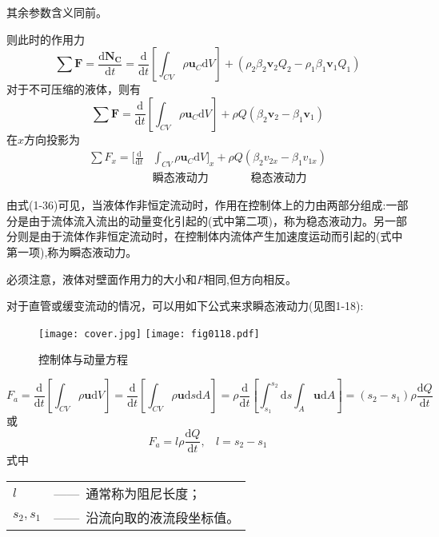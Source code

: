 其余参数含义同前。

则此时的作用力
\begin{equation*}
  \sum\boldsymbol F=\frac{\mathrm{d}\boldsymbol{N_C}}{\mathrm{d}t}=\frac{\mathrm{d}}{\mathrm{d}t}[\int_{CV}\rho {\boldsymbol u}_C \mathrm{d}V]+(\rho_2\beta_2\boldsymbol v_2 Q_2-\rho_1\beta_1\boldsymbol v_1 Q_1)
\end{equation*}
对于不可压缩的液体，则有
\begin{equation}
\sum\boldsymbol F=\frac{\mathrm{d}}{\mathrm{d}t}[\int_{CV}\rho {\boldsymbol u}_C \mathrm{d}V]+\rho Q(\beta_2\boldsymbol v_2-\beta_1\boldsymbol v_1)
\end{equation}
在$x$方向投影为
\begin{equation}
\begin{aligned}
  \sum F_x=[\frac{\mathrm{d}}{\mathrm{d}t}&\int_{CV}\rho {\boldsymbol u}_C \mathrm{d}V]_x+\rho Q(\beta_2 v_{2x}-\beta_1v_{1x})\\
  &\text{瞬态液动力}\ \ \ \ \ \ \ \ \qquad  \text{稳态液动力}
\end{aligned}
\end{equation}

由式(1-36)可见，当液体作非恒定流动时，作用在控制体上的力由两部分组成:一部分是由于流体流入流出的动量变化引起的(式中第二项)，称为稳态液动力。另一部分则是由于流体作非恒定流动时，在控制体内流体产生加速度运动而引起的(式中第一项),称为瞬态液动力。

必须注意，液体对壁面作用力的大小和$F$相同,但方向相反。

对于直管或缓变流动的情况，可以用如下公式来求瞬态液动力(见图1-18):

\begin{figure}
  \centering
  \ifOpenSource
  \texttt{[image: cover.jpg]}   
  \else
  \texttt{[image: fig0118.pdf]}
  \fi
  \caption{控制体与动量方程}
  \label{fig:fig0118}
  \end{figure}

\begin{equation*}
 F_a=\frac{\mathrm{d}}{\mathrm{d}t}[\int_{CV}\rho {\boldsymbol u} \mathrm{d}V]=\frac{\mathrm{d}}{\mathrm{d}t}[\int_{CV}\rho {\boldsymbol u} \mathrm{d}s\mathrm{d}A]
 =\rho\frac{\mathrm{d}}{\mathrm{d}t}[\int_{s_1}^{s_2}\mathrm{d}s\int_A\boldsymbol u\mathrm{d}A]=(s_2-s_1)\rho\frac{\mathrm{d}Q}{\mathrm{d}t}
\end{equation*}
或
\begin{equation}
  F_a=l\rho\frac{\mathrm{d}Q}{\mathrm{d}t},\ \ \ \ l=s_2-s_1
\end{equation}
\noindent 式中\
\begin{tabular}[t]{ll}
\qquad$l$ &——\ 通常称为阻尼长度；\\
$s_2,s_1$ &——\ 沿流向取的液流段坐标值。
\end{tabular}


